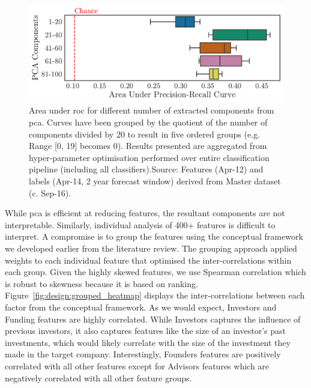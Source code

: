 \documentclass[../thesis/thesis.tex]{subfiles}
\begin{document}
\begin{figure}[!htb]
    \centering
    \includegraphics[width=\textwidth]{../figures/design/auc_extractor}
    \caption[Area under PR Curves by PCA techniques]{Area under \gls{roc} for different number of extracted components from \gls{pca}. Curves have been grouped by the quotient of the number of components divided by 20 to result in five ordered groups (e.g. Range [0, 19] becomes 0). Results presented are aggregated from hyper-parameter optimisation performed over entire classification pipeline (including all classifiers).Source: Features (Apr-12) and labels (Apr-14, 2 year forecast window) derived from Master dataset (c. Sep-16).}
    \label{fig:design:extractor}
\end{figure}

While \gls{pca} is efficient at reducing features, the resultant components are not interpretable. Similarly, individual analysis of 400+ features is difficult to interpret. A compromise is to group the features using the conceptual framework we developed earlier from the literature review. The grouping approach applied weights to each individual feature that optimised the inter-correlations within each group. Given the highly skewed features, we use Spearman correlation which is robust to skewness because it is based on ranking. Figure~\ref{fig:design:grouped_heatmap} displays the inter-correlations between each factor from the conceptual framework. As we would expect, Investors and Funding features are highly correlated. While Investors captures the influence of previous investors, it also captures features like the size of an investor's past investments, which would likely correlate with the size of the investment they made in the target company. Interestingly, Founders features are positively correlated with all other features except for Advisors features which are negatively correlated with all other feature groups.
\end{document}
